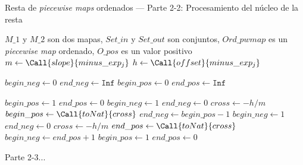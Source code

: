 \begin{algorithm}
\caption{Resta de \textit{piecewise maps} ordenados — Parte 2-2: Procesamiento del núcleo de la resta}
\label{alg:resta-nuecleo-ord2}
\begin{algorithmic}[1]
\Require $M\_1$ y $M\_2$ son dos mapas, $Set\_in$ y $Set\_out$ son conjuntos, $Ord\_pwmap$ es un \textit{piecewise map} ordenado, $O\_pos$ es un valor positivo
        \State $m \gets \Call{slope}{minus\_exp_j}$
        \State $h \gets \Call{offset}{minus\_exp_j}$

        \State $begin\_neg \gets 0$
        \State $end\_neg \gets \texttt{Inf}$
        \State $begin\_pos \gets 0$
        \State $end\_pos \gets \texttt{Inf}$

                \State $begin\_pos \gets 1$
                \State $end\_pos \gets 0$
            \Else
                \State $begin\_neg \gets 1$
                \State $end\_neg \gets 0$
            \EndIf
            \State $cross \gets -h / m$
                \State $begin\_pos \gets \Call{toNat}{cross}$
                    \State $end\_neg \gets begin\_pos - 1$
                \Else
                    \State $begin\_neg \gets 1$
                    \State $end\_neg \gets 0$
                \EndIf
            \EndIf
        \Else
            \State $cross \gets -h / m$
                \State $end\_pos \gets \Call{toNat}{cross}$
                    \State $begin\_neg \gets end\_pos + 1$
                \EndIf
            \Else
                \State $begin\_pos \gets 1$
                \State $end\_pos \gets 0$
            \EndIf
        \EndIf

       \State Parte 2-3...
    \EndFor

\EndFunction
\end{algorithmic}
\end{algorithm}




